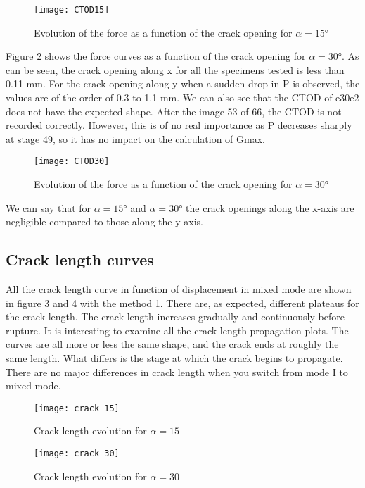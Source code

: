 \begin{figure}[H]
	\centering
	\texttt{[image: CTOD15]}
	\caption{Evolution of the force as a function of the crack opening for $\alpha=15°$}
	\label{fig:CTOD15}
\end{figure}

Figure \ref{fig:CTOD30} shows the force curves as a function of the crack opening for $\alpha=30°$. As can be seen, the crack opening along x for all the specimens tested is less than 0.11 mm. For the crack opening along y when a sudden drop in P is observed, the values are of the order of 0.3 to 1.1 mm. 
We can also see that the CTOD of e30e2 does not have the expected shape. After the image 53 of 66, the CTOD is not recorded correctly. However, this is of no real importance as P decreases sharply at stage 49, so it has no impact on the calculation of Gmax.

\begin{figure}[H]
	\centering
	\texttt{[image: CTOD30]}
	\caption{Evolution of the force as a function of the crack opening for $\alpha=30°$}
	\label{fig:CTOD30}
\end{figure}

We can say that for $\alpha=15°$ and $\alpha=30°$ the crack openings along the x-axis are negligible compared to those along the y-axis. 

\subsection{Crack length curves}

All the crack length curve in function of displacement in mixed mode are shown in figure \ref{fig:crack_15} and \ref{fig:crack_30} with the method 1. 
There are, as expected, different plateaus for the crack length. The crack length increases gradually and continuously before rupture. It is interesting to examine all the crack length propagation plots.  The curves are all more or less the same shape, and the crack ends at roughly the same length. What differs is the stage at which the crack begins to propagate. There are no major differences in crack length when you switch from mode I to mixed mode.

\begin{figure}[htp]
	\centering
	\texttt{[image: crack\_15]}
	\caption{Crack length evolution for $\alpha=15$}
	\label{fig:crack_15}
\end{figure}

\begin{figure}[htp]
	\centering
	\texttt{[image: crack\_30]}
	\caption{Crack length evolution for $\alpha=30$}
	\label{fig:crack_30}
\end{figure}

